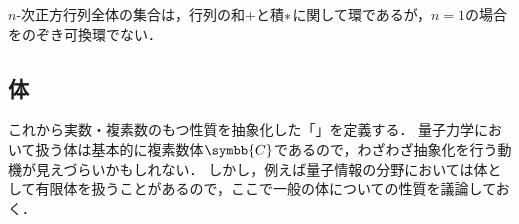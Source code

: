\documentclass[../sotsu.tex]{subfiles}
\begin{document}
\begin{example}
    $n$-次正方行列全体の集合は，行列の和$+$と積$\mathbin{\ast}$に関して環であるが，$n = 1$の場合をのぞき可換環でない．
\end{example}



\subsection{体}

これから実数・複素数のもつ性質を抽象化した「」を定義する．
量子力学において扱う体は基本的に複素数体$\symbb{C}$であるので，わざわざ抽象化を行う動機が見えづらいかもしれない．
しかし，例えば量子情報の分野においては体として有限体を扱うことがあるので，ここで一般の体についての性質を議論しておく．
\end{document}

